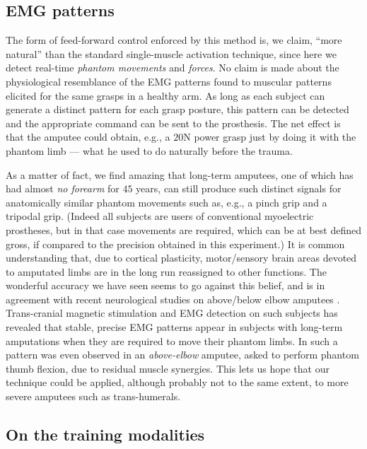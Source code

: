 \subsection{EMG patterns}

The form of feed-forward control enforced by this method is, we claim, ``more
natural'' than the standard single-muscle activation technique, since here
we detect real-time \emph{phantom movements} and \emph{forces}.
No claim is made about the physiological resemblance of the EMG patterns found
to muscular patterns elicited for the same grasps in a healthy arm. As long as
each subject can generate a distinct pattern for each grasp posture, this pattern
can be detected and the appropriate command can be sent to the prosthesis.
The net effect is that the amputee could obtain, e.g., a $20$N power grasp just
by doing it with the phantom limb --- what he used to do naturally before the trauma.

As a matter of fact, we find amazing that long-term amputees, one of which has
had almost \emph{no forearm} for $45$ years, can still produce such distinct signals
for anatomically similar phantom movements such as, e.g., a pinch grip and a
tripodal grip. (Indeed all subjects are users of conventional myoelectric
prostheses, but in that case movements are required, which can be at
best defined gross, if compared to the precision obtained in this experiment.)
It is common understanding that, due to cortical plasticity, motor/sensory brain
areas devoted to amputated limbs are in the long run reassigned to other
functions. The wonderful accuracy we have seen seems to go against this belief,
and is in agreement with recent neurological studies on above/below elbow
amputees \cite{sirigu1,sirigu2}. Trans-cranial magnetic stimulation and EMG detection
on such subjects has revealed that stable, precise EMG patterns appear in subjects with long-term
amputations when they are required to move their phantom limbs. In \cite{sirigu2}
such a pattern was even observed in an \emph{above-elbow} amputee, asked to perform
phantom thumb flexion, due to residual muscle synergies. This lets us hope that
our technique could be applied, although probably not to the same extent, to more
severe amputees such as trans-humerals.

\subsection{On the training modalities}

